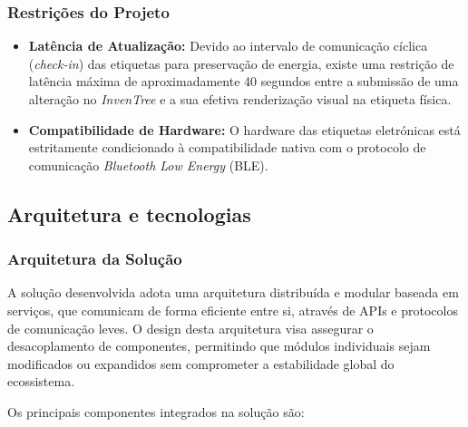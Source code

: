 \documentclass[10pt]{article}
\begin{document}
\subsubsection*{Restrições do Projeto}
\begin{itemize}
    \item \textbf{Latência de Atualização:} Devido ao intervalo de comunicação cíclica (\textit{check-in}) das etiquetas para preservação de energia, existe uma restrição de latência máxima de aproximadamente 40 segundos entre a submissão de uma alteração no \textit{InvenTree} e a sua efetiva renderização visual na etiqueta física.
    \item \textbf{Compatibilidade de Hardware:} O hardware das etiquetas eletrónicas está estritamente condicionado à compatibilidade nativa com o protocolo de comunicação \textit{Bluetooth Low Energy} (BLE).
\end{itemize}

\subsection{Arquitetura e tecnologias}

\subsubsection{Arquitetura da Solução}

A solução desenvolvida adota uma arquitetura distribuída e modular baseada em serviços, que comunicam de forma eficiente entre si, através de APIs e protocolos de comunicação leves. O design desta arquitetura visa assegurar o desacoplamento de componentes, permitindo que módulos individuais sejam modificados ou expandidos sem comprometer a estabilidade global do ecossistema.

Os principais componentes integrados na solução são:
\end{document}
